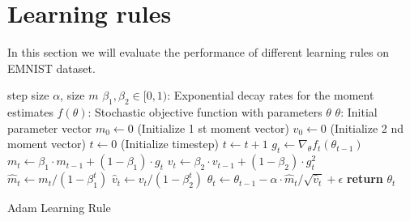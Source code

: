 \documentclass{article}
\begin{document}
 
%
%


\section{Learning rules}
In this section we will evaluate the performance of different learning rules on EMNIST dataset.



\begin{algorithm}[ht]
\begin{algorithmic}
    step size $\alpha$, size $m$
    $\beta_1 , \beta_2 \in [0,1)  $: Exponential decay rates for the moment estimates
    $f(\theta)$: Stochastic objective function with parameters $\theta$
    $\theta$: Initial parameter vector
   \STATE $m_0  \gets 0$ (Initialize 1 st moment vector)
   \STATE $v_0 \gets 0$ (Initialize 2 nd moment vector)
   \STATE $t \gets 0$ (Initialize timestep)   
   \STATE $ t \gets t+1 $
   \STATE $ g_t \gets \nabla_\theta f_t ( \theta_{t-1} )  $
   \STATE $ m_t \gets \beta_1 \cdot m_{t-1} + (1-\beta_1) \cdot g_t $
   \STATE $ v_t \gets \beta_2 \cdot v_{t-1} + (1-\beta_2) \cdot g_t^2 $
   \STATE $ \hat m_t \gets  m_{t} /   (1-\beta_1^t)  $
   \STATE $ \hat v_t \gets  v_{t} /   (1-\beta_2^t)  $
   \STATE $ \theta_t \gets \theta_{t-1} - \alpha \cdot \hat m_{t} / 
   \sqrt{ \hat v_t } + \epsilon $
   \ENDWHILE
   \STATE \textbf{return} $\theta_t$
   
\end{algorithmic}
  \caption{Adam Learning Rule}
  \label{alg:adam}
\end{algorithm}
\end{document}
